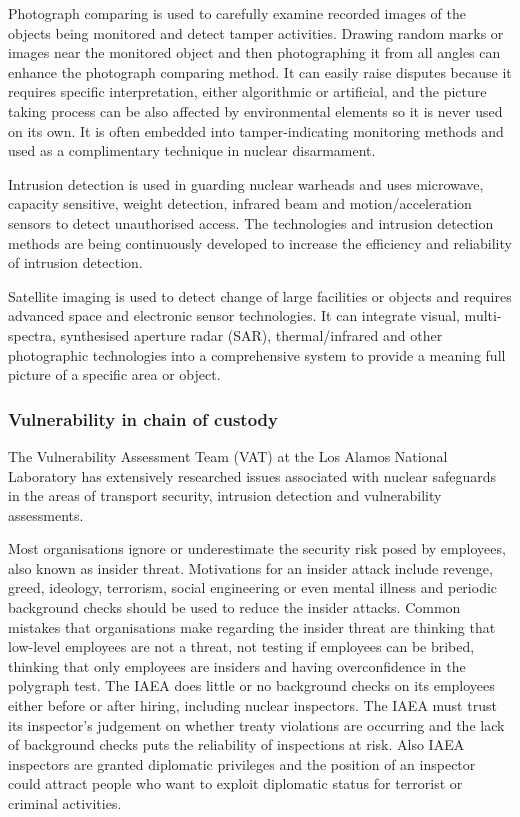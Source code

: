 \documentclass[twoside,titlepage,11pt,twocolumn,a4paper]{article}
\begin{document}
Photograph comparing is used to carefully examine recorded images of
the objects being monitored and detect tamper activities. Drawing
random marks or images near the monitored object and then
photographing it from all angles can enhance the photograph comparing
method. It can easily raise disputes because it requires specific
interpretation, either algorithmic or artificial, and the picture
taking process can be also affected by environmental elements so it is
never used on its own. It is often embedded into tamper-indicating
monitoring methods and used as a complimentary technique in nuclear
disarmament. \citep{wuwen2004}

Intrusion detection is used in guarding nuclear warheads and uses
microwave, capacity sensitive, weight detection, infrared beam and
motion/acceleration sensors to detect unauthorised access. The
technologies and intrusion detection methods are being continuously
developed to increase the efficiency and reliability of intrusion
detection. \citep{wuwen2004}

Satellite imaging is used to detect change of large facilities or
objects and requires advanced space and electronic sensor
technologies. It can integrate visual, multi-spectra, synthesised
aperture radar (SAR), thermal/infrared and other photographic
technologies into a comprehensive system to provide a meaning full
picture of a specific area or object. \citep{wuwen2004}

\subsubsection{Vulnerability in chain of custody}
The Vulnerability Assessment Team (VAT) at the Los Alamos National
Laboratory has extensively researched issues associated with nuclear
safeguards in the areas of transport security, intrusion detection and
vulnerability assessments. \citep{nuclearSafeguardsAndSec2005}

Most organisations ignore or underestimate the security risk posed by
employees, also known as insider threat.
\citep{nuclearSafeguardsAndSec2005} Motivations for an insider attack
include revenge, greed, ideology, terrorism, social engineering or
even mental illness and periodic background checks should be used to
reduce the insider attacks. Common mistakes that organisations make
regarding the insider threat are thinking that low-level employees are
not a threat, not testing if employees can be bribed, thinking that
only employees are insiders and having overconfidence in the polygraph
test. \citep{insiderThreat2011} The IAEA does little or no background
checks on its employees either before or after hiring, including
nuclear inspectors. The IAEA must trust its inspector’s judgement on
whether treaty violations are occurring and the lack of background
checks puts the reliability of inspections at risk. Also IAEA
inspectors are granted diplomatic privileges and the position of an
inspector could attract people who want to exploit diplomatic status
for terrorist or criminal
activities. \citep{nuclearSafeguardsAndSec2005}
\end{document}
